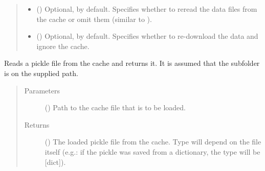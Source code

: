 \documentclass[letterpaper,10pt,english]{sphinxmanual}
\begin{document}
\begin{fulllineitems}
\begin{fulllineitems}
\begin{quote}
\begin{description}
\begin{itemize}
\item {} 
 () \textendash{} Optional,  by default. Specifies whether to reread
the data files from the cache or omit them (similar to
).

\item {} 
 () \textendash{} Optional,  by default. Specifies whether to
re-download the data and ignore the cache.

\end{itemize}

\end{description}\end{quote}

\end{fulllineitems}


\begin{fulllineitems}
\label{\detokenize{reference:pypath.main.PyPath.read_from_cache}}
Reads a pickle file from the cache and returns it. It is assumed
that the subfolder  is on the supplied path.
\begin{quote}\begin{description}
\item[{Parameters}] \leavevmode
{} () \textendash{} Path to the cache file that is to be loaded.

\item[{Returns}] \leavevmode
() \textendash{} The loaded pickle file from the cache. Type will
depend on the file itself (e.g.: if the pickle was saved
from a dictionary, the type will be {[}dict{]}).

\end{description}\end{quote}

\end{fulllineitems}



\end{fulllineitems}
\end{document}
